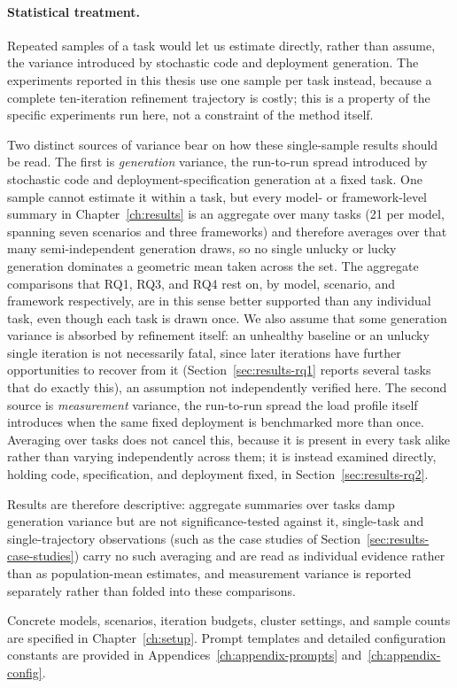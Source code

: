 \paragraph{Statistical treatment.}
Repeated samples of a task would let us estimate directly, rather than
assume, the variance introduced by stochastic code and deployment
generation. The experiments reported in this thesis use one sample per
task instead, because a complete ten-iteration refinement trajectory is
costly; this is a property of the specific experiments run here, not a
constraint of the method itself.

Two distinct sources of variance bear on how these single-sample results
should be read. The first is \emph{generation} variance, the run-to-run
spread introduced by stochastic code and deployment-specification
generation at a fixed task. One sample cannot estimate it within a task,
but every model- or framework-level summary in Chapter~\ref{ch:results}
is an aggregate over many tasks (21 per model, spanning seven scenarios
and three frameworks) and therefore averages over that many
semi-independent generation draws, so no single unlucky or lucky
generation dominates a geometric mean taken across the set. The aggregate
comparisons that RQ1, RQ3, and RQ4 rest on, by model, scenario, and
framework respectively, are in this sense better
supported than any individual task, even though each task is drawn once.
We also assume that some generation variance is absorbed by refinement
itself: an unhealthy baseline or an unlucky single iteration is not
necessarily fatal, since later iterations have further opportunities to
recover from it (Section~\ref{sec:results-rq1} reports several tasks that
do exactly this), an assumption not independently verified here. The
second source is \emph{measurement} variance, the run-to-run spread the
load profile itself introduces when the same fixed deployment is
benchmarked more than once. Averaging over tasks does not cancel this,
because it is present in every task alike rather than varying
independently across them; it is instead examined directly, holding code,
specification, and deployment fixed, in Section~\ref{sec:results-rq2}.

Results are therefore descriptive: aggregate summaries over tasks damp
generation variance but are not significance-tested against it, single-task
and single-trajectory observations (such as the case studies of
Section~\ref{sec:results-case-studies}) carry no such averaging and are read as
individual evidence rather than as population-mean estimates, and
measurement variance is reported separately rather than folded into these
comparisons.

Concrete models, scenarios, iteration budgets, cluster settings, and sample
counts are specified in Chapter~\ref{ch:setup}. Prompt templates and detailed
configuration constants are provided in Appendices~\ref{ch:appendix-prompts}
and~\ref{ch:appendix-config}.
